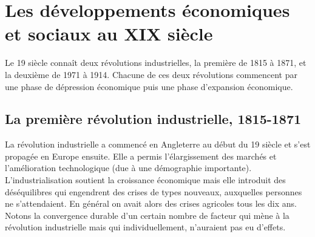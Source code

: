 \documentclass[12pt]{report}
\begin{document}
\chapter{Les développements économiques et sociaux au XIX siècle}

Le 19 siècle connaît deux révolutions industrielles, la première de 1815 à 1871, et la deuxième de 1971 à 1914.
Chacune de ces deux révolutions commencent par une phase de dépression économique puis
une phase d’expansion économique.

\section{La première révolution industrielle, 1815-1871}

La révolution industrielle a commencé en Angleterre au début du 19 siècle et s’est
propagée en Europe ensuite. Elle a permis l’élargissement des marchés et
l’amélioration technologique (due à une démographie importante). L’industrialisation 
soutient la croissance économique mais elle introduit des déséquilibres qui 
engendrent des crises de types nouveaux, auxquelles personnes ne s’attendaient. En général on
avait alors des crises agricoles tous les dix ans. Notons la convergence durable d’un certain
nombre de facteur qui mène à la révolution industrielle mais qui individuellement, n’auraient
pas eu d’effets.
\end{document}
